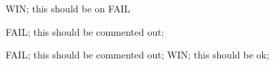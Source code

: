 %
%
%
WIN; this should be on
FAIL


FAIL; this should be commented out;

FAIL; this should be commented out;
WIN; this should be ok;

